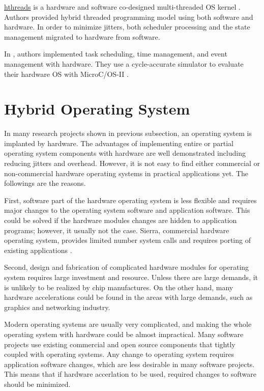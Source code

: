 \documentclass[10pt,a4paper]{article}
\begin{document}
\begin{multicols}{2}
\url{hthreads} is a hardware and software co-designed multi-threaded OS kernel \cite{Andrews_hthread}. Authors provided hybrid threaded programming model using both software and hardware. In order to minimize jitters, both scheduler processing and the state management migrated to hardware from software.

In \cite{kohout_2003}, authors implemented task scheduling, time management, and event management with hardware. They use a cycle-accurate simulator to evaluate their hardware OS with MicroC/OS-II \cite{ucos}.

\section{Hybrid Operating System}


In many research projects shown in previous subsection, an operating system is implanted by hardware. The advantages of implementing entire or partial operating system components with hardware are well demonstrated including reducing jitters and overhead. However, it is not easy to find either commercial or non-commercial hardware operating systems in practical applications yet. The followings are the reasons.


First, software part of the hardware operating system is less flexible and requires major changes to the operating system software and application software. This could be solved if the hardware modules changes are hidden to application programs; however, it usually not the case. Sierra, commercial hardware operating system, provides limited number system calls and requires porting of existing applications \cite{sierra}. 

Second, design and fabrication of complicated hardware modules for operating system requires large investment and resource. Unless there are large demands, it is unlikely to be realized by chip manufactures. On the other hand, many hardware accelerations could be found in the areas with large demands, such as graphics and networking industry.

Modern operating systems are usually very complicated, and making the whole operating system with hardware could be almost impractical. Many software projects use existing commercial and open source components that tightly coupled with operating systems. Any change to operating system requires application software changes, which are less desirable in many software projects. This means that if hardware accerlation to be used, required changes to software should be minimized.



\end{multicols}
\end{document}
